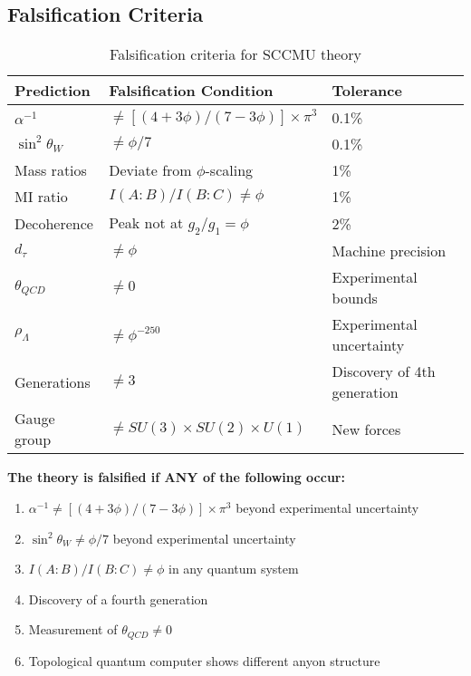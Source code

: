 \documentclass[11pt]{article}
\theoremstyle{definition}
\newcommand{\goldenratio}{\phi}
\begin{document}
\subsection{Falsification Criteria}

\begin{table}[h]
\centering
\caption{Falsification criteria for SCCMU theory}
\label{tab:falsification_criteria}
\begin{tabular}{lll}
\toprule
\textbf{Prediction} & \textbf{Falsification Condition} & \textbf{Tolerance} \\
\midrule
$\alpha^{-1}$ & $\neq [(4+3\goldenratio)/(7-3\goldenratio)]\times\pi^3$ & 0.1\% \\
$\sin^2\theta_W$ & $\neq \goldenratio/7$ & 0.1\% \\
Mass ratios & Deviate from $\goldenratio$-scaling & 1\% \\
MI ratio & $I(A:B)/I(B:C) \neq \goldenratio$ & 1\% \\
Decoherence & Peak not at $g_2/g_1 = \goldenratio$ & 2\% \\
$d_\tau$ & $\neq \goldenratio$ & Machine precision \\
$\theta_{QCD}$ & $\neq 0$ & Experimental bounds \\
$\rho_\Lambda$ & $\neq \goldenratio^{-250}$ & Experimental uncertainty \\
Generations & $\neq 3$ & Discovery of 4th generation \\
Gauge group & $\neq SU(3) \times SU(2) \times U(1)$ & New forces \\
\bottomrule
\end{tabular}
\end{table}

\textbf{The theory is falsified if ANY of the following occur:}

\begin{enumerate}
\item $\alpha^{-1} \neq [(4+3\goldenratio)/(7-3\goldenratio)]\times\pi^3$ beyond experimental uncertainty
\item $\sin^2\theta_W \neq \goldenratio/7$ beyond experimental uncertainty
\item $I(A:B)/I(B:C) \neq \goldenratio$ in any quantum system
\item Discovery of a fourth generation
\item Measurement of $\theta_{QCD} \neq 0$
\item Topological quantum computer shows different anyon structure
\end{enumerate}
\end{document}
